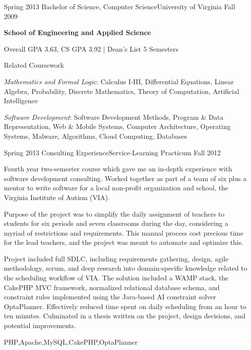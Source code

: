 \begin{scholarship}
  \experience
    {Spring 2013}   {Bachelor of Science, Computer Science}{University of Virginia}
    {Fall 2009} 
                    {
                        \textbf{School of Engineering and Applied Science}

                        Overall GPA 3.63, CS GPA 3.92 | Dean's List 5 Semesters 

                        \textcolor{accentcolor}{Related Coursework}

                        \textit{Mathematics and Formal Logic}: Calculus I-III, Differential Equations, Linear Algebra, Probability, Discrete Mathematics, Theory of Computation, Artificial Intelligence

                        \textit{Software Development}: Software Development Methods, Program \& Data Representation, Web \& Mobile Systems, Computer Architecture, Operating Systems, Malware, Algorithms, Cloud Computing, Databases
                    }
                    {}
  \experience
    {Spring 2013}  {Consulting Experience}{Service-Learning Practicum}
    {Fall 2012}    {
                        Fourth year two-semester course which gave me an in-depth experience with software development consulting. Worked together as part of a team of six plus a mentor to write software for a local non-profit organization and school, the Virginia Institute of Autism (VIA).

                        \vspace{0.5em}

                        Purpose of the project was to simplify the daily assignment of teachers to students for six periods and seven classrooms during the day, considering a myriad of restrictions and requirements. This manual process cost precious time for the lead teachers, and the project was meant to automate and optimize this.

                        \vspace{0.5em}

                        Project included full SDLC, including requirements gathering, design, agile methodology, scrum, and deep research into domain-specific knowledge related to the scheduling workflow of VIA. The solution included a WAMP stack, the CakePHP MVC framework, normalized relational database schema, and constraint rules implemented using the Java-based AI constraint solver OptaPlanner. Effectively reduced time spent on daily scheduling from an hour to ten minutes. Culminated in a thesis written on the project, design decisions, and potential improvements.
                    }
                    {PHP,Apache,MySQL,CakePHP,OptaPlanner}
\end{scholarship}
\filbreak